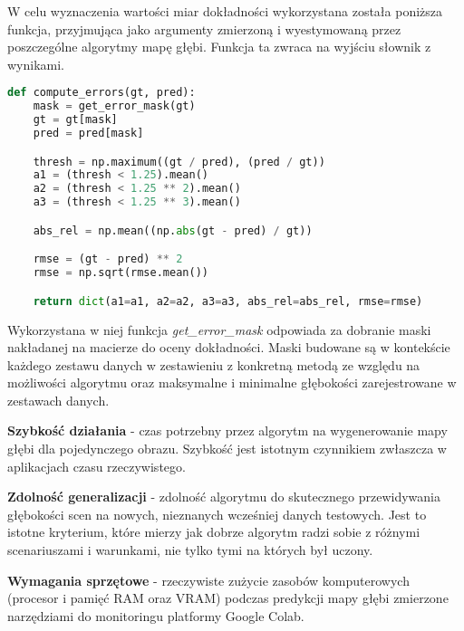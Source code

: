 W celu wyznaczenia wartości miar dokładności wykorzystana została poniższa funkcja, przyjmująca jako argumenty zmierzoną i wyestymowaną przez poszczególne algorytmy mapę głębi. Funkcja ta zwraca na wyjściu słownik z wynikami.

\begin{lstlisting}[style=EEStyle,language=python,numbers=none,frame=none]
def compute_errors(gt, pred):
    mask = get_error_mask(gt)
    gt = gt[mask]
    pred = pred[mask]

    thresh = np.maximum((gt / pred), (pred / gt))
    a1 = (thresh < 1.25).mean()
    a2 = (thresh < 1.25 ** 2).mean()
    a3 = (thresh < 1.25 ** 3).mean()

    abs_rel = np.mean((np.abs(gt - pred) / gt))

    rmse = (gt - pred) ** 2
    rmse = np.sqrt(rmse.mean())

    return dict(a1=a1, a2=a2, a3=a3, abs_rel=abs_rel, rmse=rmse)
\end{lstlisting}

Wykorzystana w niej funkcja \textit{get\_error\_mask} odpowiada za dobranie maski nakładanej na macierze do oceny dokładności. Maski budowane są w kontekście każdego zestawu danych w zestawieniu z konkretną metodą ze względu na możliwości algorytmu oraz maksymalne i minimalne głębokości zarejestrowane w zestawach danych.

\textbf{Szybkość działania} - czas potrzebny przez algorytm na wygenerowanie mapy głębi dla pojedynczego obrazu. Szybkość jest istotnym czynnikiem zwłaszcza w aplikacjach czasu rzeczywistego.

\textbf{Zdolność generalizacji} - zdolność algorytmu do skutecznego przewidywania głębokości scen na nowych, nieznanych wcześniej danych testowych. Jest to istotne kryterium, które mierzy jak dobrze algorytm radzi sobie z różnymi scenariuszami i warunkami, nie tylko tymi na których był uczony.

\textbf{Wymagania sprzętowe} - rzeczywiste zużycie zasobów komputerowych (procesor i pamięć RAM oraz VRAM) podczas predykcji mapy głębi zmierzone narzędziami do monitoringu platformy Google Colab.

